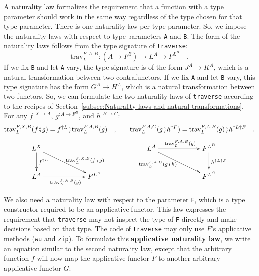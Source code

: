 A naturality law formalizes the requirement that a function with a
type parameter should work in the same way regardless of the type
chosen for that type parameter. There is one naturality law per type
parameter. So, we impose the naturality laws with respect to type
parameters \lstinline!A! and \lstinline!B!. The form of the naturality
laws follows from the type signature of \lstinline!traverse!:
\[
\text{trav}_{L}^{F,A,B}:(A\rightarrow F^{B})\rightarrow L^{A}\rightarrow F^{L^{B}}\quad.
\]
If we fix \lstinline!B! and let \lstinline!A! vary, the type signature
is of the form $J^{A}\rightarrow K^{A}$, which is a natural transformation
between two contrafunctors. If we fix \lstinline!A! and let \lstinline!B!
vary, this type signature has the form $G^{A}\rightarrow H^{A}$,
which is a natural transformation between two functors. So, we can
formulate the two naturality
laws of \lstinline!traverse! according to the recipes of Section~\ref{subsec:Naturality-laws-and-natural-transformations}.
For any $f^{:X\rightarrow A}$, $g^{:A\rightarrow F^{B}}$, and $h^{:B\rightarrow C}$:
\begin{equation}
\text{trav}_{L}^{F,X,B}(f\bef g)=f^{\uparrow L}\bef\text{trav}_{L}^{F,A,B}(g)\quad,\quad\quad\text{trav}_{L}^{F,A,C}(g\bef h^{\uparrow F})=\text{trav}_{L}^{F,A,B}(g)\bef h^{\uparrow L\uparrow F}\quad.\label{eq:naturality-laws-of-traverse}
\end{equation}
\vspace{-1.2\baselineskip}
\[
\xymatrix{\xyScaleY{2.0pc}\xyScaleX{5.0pc}L^{X}\ar[rd]\sp(0.6){~~\text{trav}_{L}^{F,X,B}(f\bef g)}\ar[d]\sp(0.45){f^{\uparrow L}} &  & L^{A}\ar[rd]\sb(0.35){\text{trav}_{L}^{F,A,C}(g\bef h)~~}\ar[r]\sp(0.5){\text{trav}_{L}^{F,A,B}(g)} & F^{L^{B}}\ar[d]\sp(0.45){h^{\uparrow L\uparrow F}}\\
L^{A}\ar[r]\sb(0.5){\text{trav}_{L}^{F,A,B}(g)} & F^{L^{B}} &  & F^{L^{C}}
}
\]

We also need a naturality law with respect to the parameter \lstinline!F!,
which is a type constructor required to be an applicative functor.
This law expresses the requirement that \lstinline!traverse! may
not inspect the type of \lstinline!F! directly and make decisions
based on that type. The code of \lstinline!traverse! may only use
$F$\textsf{'}s applicative methods (\lstinline!wu! and \lstinline!zip!).
To formulate this \textbf{applicative naturality law},
we write an equation similar to the second naturality law, except
that the arbitrary function $f$ will now map the applicative functor
$F$ to another arbitrary applicative functor $G$:

